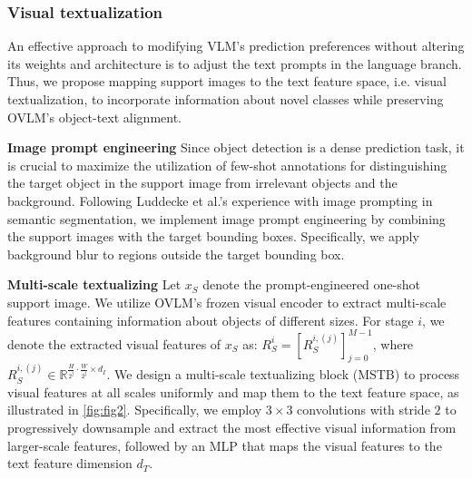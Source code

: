 \documentclass[10pt,twocolumn,letterpaper]{article}
\begin{document}
\subsubsection{Visual textualization}
An effective approach to modifying VLM's prediction preferences without altering its weights and architecture is to adjust the text prompts in the language branch. Thus, we propose mapping support images to the text feature space, i.e. visual textualization, to incorporate information about novel classes while preserving OVLM's object-text alignment.

\textbf{Image prompt engineering} Since object detection is a dense prediction task, it is crucial to maximize the utilization of few-shot annotations for distinguishing the target object in the support image from irrelevant objects and the background. Following Luddecke et al.’s \cite{luddecke2022clipseg} experience with image prompting in semantic segmentation, we implement image prompt engineering by combining the support images with the target bounding boxes. Specifically, we apply background blur to regions outside the target bounding box. 

\textbf{Multi-scale textualizing} Let $x_S$ denote the prompt-engineered one-shot support image. We utilize OVLM’s frozen visual encoder to extract multi-scale features containing information about objects of different sizes. For stage $i$, we denote the extracted visual features of $x_S$ as: $R_S^i=\left[ R_S^{i,(j)}\right]_{j=0}^{M-1}$, where $R_S^{i,(j)}\in \mathbb{R}^{\frac{H}{2^j}\cdot \frac{W}{2^j} \times d_I}$. We design a multi-scale textualizing block (MSTB) to process visual features at all scales uniformly and map them to the text feature space, as illustrated in \cref{fig:fig2}. Specifically, we employ $3\times3$ convolutions with stride $2$ to progressively downsample and extract the most effective visual information from larger-scale features, followed by an MLP that maps the visual features to the text feature dimension $d_T$. %
\end{document}
